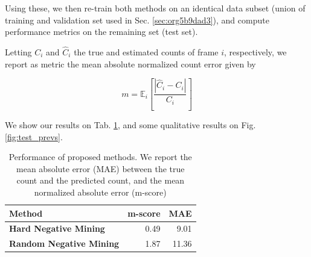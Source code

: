 \documentclass[11pt]{article}
\begin{document}
Using these, we then re-train both methods on an identical data subset (union of training and validation set used in Sec. \ref{sec:org5b9dad3}), and compute performance metrics on the remaining set (test set).

Letting \(C_i\) and \(\hat{C}_i\) the true and estimated counts of frame \(i\), respectively, we report as metric the mean absolute normalized count error given by

\[
m = \mathbb{E}_i \left[ \frac{|\hat{C}_i - C_i|}{C_i} \right]
\]

We show our results on Tab. \ref{tab:orge598bfb}, and some qualitative results on Fig. \ref{fig:test_prevs}.

\begin{table}[htbp]
\centering
\begin{tabular}{lrr}
Method & m-score & MAE\\
\hline
\textbf{Hard Negative Mining} & 0.49 & 9.01\\
\textbf{Random Negative Mining} & 1.87 & 11.36\\
\end{tabular}
\caption{\label{tab:orge598bfb}Performance of proposed methods. We report the mean absolute error (MAE) between the true count and the predicted count, and the mean normalized absolute error (m-score)}

\end{table}
\end{document}
